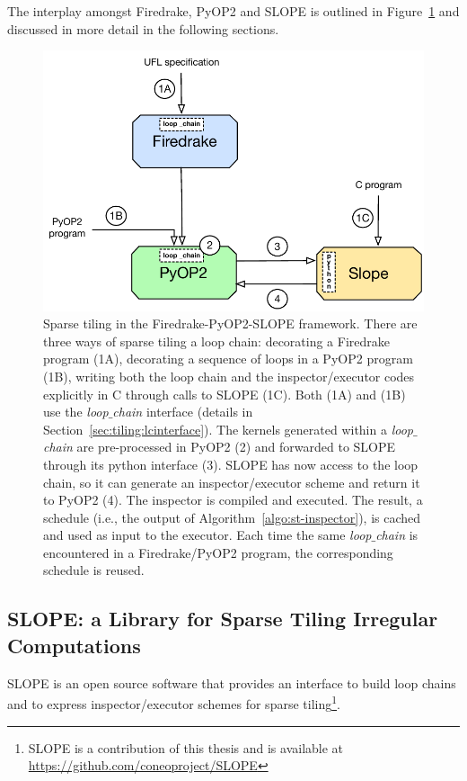 The interplay amongst Firedrake, PyOP2 and SLOPE is outlined in Figure~\ref{fig:st-implementation} and discussed in more detail in the following sections.

\begin{figure}[htpb]
\centering
\includegraphics[scale=0.6]{sparsetiling/figures/firedrake-pyop2-slope.pdf}
\caption{Sparse tiling in the Firedrake-PyOP2-SLOPE framework. There are three ways of sparse tiling a loop chain: decorating a Firedrake program (1A), decorating a sequence of loops in a PyOP2 program (1B), writing both the loop chain and the inspector/executor codes explicitly in C through calls to SLOPE (1C). Both (1A) and (1B) use the {\em loop$\_$chain} interface (details in Section~\ref{sec:tiling:lcinterface}). The kernels generated within a {\em loop$\_$chain} are pre-processed in PyOP2 (2) and forwarded to SLOPE through its python interface (3). SLOPE has now access to the loop chain, so it can generate an inspector/executor scheme and return it to PyOP2 (4). The inspector is compiled and executed. The result, a schedule (i.e., the output of Algorithm~\ref{algo:st-inspector}), is cached and used as input to the executor. Each time the same {\em loop$\_$chain} is encountered in a Firedrake/PyOP2 program, the corresponding schedule is reused.}
\label{fig:st-implementation}
\end{figure}

\subsection{SLOPE: a Library for Sparse Tiling Irregular Computations}
\label{sec:tiling:impl-slope}
SLOPE is an open source software that provides an interface to build loop chains and to express inspector/executor schemes for sparse tiling\footnote{SLOPE is a contribution of this thesis and is available at \url{https://github.com/coneoproject/SLOPE}}. 

